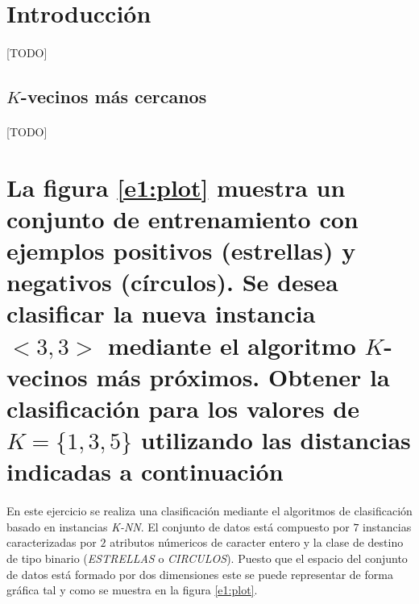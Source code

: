 \documentclass{article}
\begin{document}
	\maketitle %

	\thispagestyle{fancy} %



	\begin{abstract}
		\noindent [TODO ]
	\end{abstract}



	\section{Introducción}
	\label{sec:introducción}

		\paragraph{}
		[TODO]

		\subsection{$K$-vecinos más cercanos}

			\paragraph{}
			[TODO]

	\section{La figura \ref{e1:plot} muestra un conjunto de entrenamiento con ejemplos positivos (estrellas) y negativos (círculos). Se desea clasificar la nueva instancia $<3,3>$ mediante el algoritmo $K$-vecinos más próximos. Obtener la clasificación para los valores de $K=\{ 1, 3, 5\}$ utilizando las distancias indicadas a continuación}
	\label{sec:e1}

		\paragraph{}
		En este ejercicio se realiza una clasificación mediante el algoritmos de clasificación basado en instancias \emph{K-NN}. El conjunto de datos está compuesto por $7$ instancias caracterizadas por $2$ atributos númericos de caracter entero y la clase de destino de tipo binario (\emph{ESTRELLAS} o \emph{CIRCULOS}). Puesto que el espacio del conjunto de datos está formado por dos dimensiones este se puede representar de forma gráfica tal y como se muestra en la figura \ref{e1:plot}.
\end{document}

